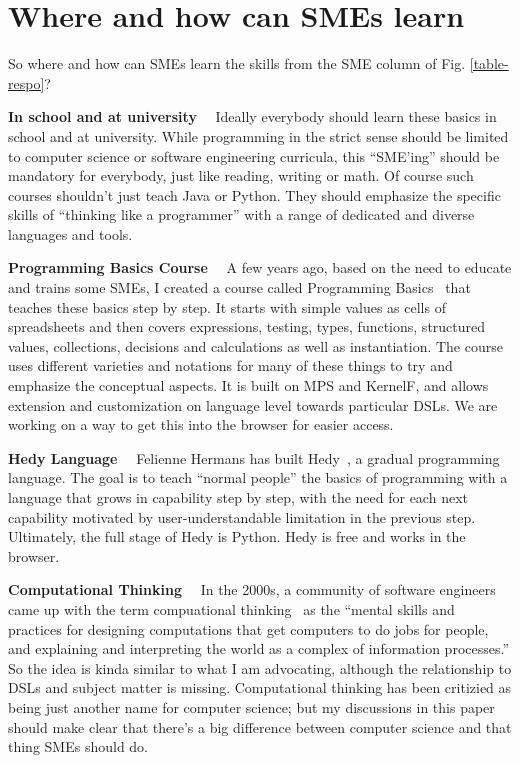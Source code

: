 \documentclass[runningheads]{llncs}
\newcommand\parhead[1]{\vspace{1mm}\noindent\textbf{{#1}}\ \ }
\newcommand{\fig}[1]{Fig. \ref{#1}}  %
\begin{document}
\section{Where and how can SMEs learn}

So where and how can SMEs learn the skills from the SME column of \fig{table-respo}? 

\parhead{In school and at university} Ideally everybody should learn these
basics in school and at university. While programming in the strict sense should
be limited to computer science or software engineering curricula, this
``SME'ing'' should be mandatory for everybody, just like reading, writing or
math. Of course such courses shouldn't just teach Java or Python. They should
emphasize the specific skills of ``thinking like a programmer'' with a range of
dedicated and diverse languages and tools.

\parhead{Programming Basics Course} A few years ago, based on the need to
educate and trains some SMEs, I created a course called Programming
Basics~\cite{voelterProgBas} that teaches these basics step by step. It starts
with simple values as cells of spreadsheets and then covers expressions,
testing, types, functions, structured values, collections, decisions and
calculations as well as instantiation. The course uses different varieties and
notations for many of these things to try and emphasize the conceptual aspects.
It is built on MPS and KernelF, and allows extension and customization on
language level towards particular DSLs. We are working on a way to get this into
the browser for easier access.


\parhead{Hedy Language} Felienne Hermans has built Hedy~\cite{hedy}, a gradual
programming language. The goal is to teach ``normal people'' the basics of
programming with a language that grows in capability step by step, with the need
for each next capability motivated by user-understandable limitation in the
previous step. Ultimately, the full stage of Hedy is Python. Hedy is free and
works in the browser.


\parhead{Computational Thinking} In the 2000s, a community of software engineers
came up with the term compuational thinking~\cite{denning2019computational} as
the ``mental skills and practices for designing computations that get computers
to do jobs for people, and explaining and interpreting the world as a complex of
information processes.'' So the idea is kinda similar to what I am advocating,
although the relationship to DSLs and subject matter is missing. Computational
thinking has been critizied as being just another name for computer science; but
my discussions in this paper should make clear that there's a big difference
between computer science and that thing SMEs should do.
\end{document}
